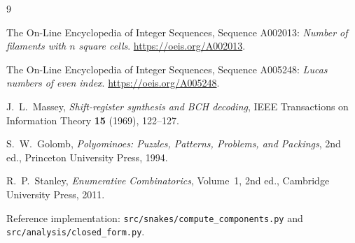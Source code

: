 \documentclass[11pt,a4paper]{article}
\theoremstyle{plain}
\theoremstyle{definition}
\theoremstyle{remark}
\numberwithin{equation}{section}
\begin{document}
\clearpage
\begin{thebibliography}{9}

The On-Line Encyclopedia of Integer Sequences, Sequence A002013:
\emph{Number of filaments with $n$ square cells}.
\url{https://oeis.org/A002013}.

The On-Line Encyclopedia of Integer Sequences, Sequence A005248:
\emph{Lucas numbers of even index}. \url{https://oeis.org/A005248}.

J.~L.~Massey, \emph{Shift-register synthesis and BCH decoding},
IEEE Transactions on Information Theory \textbf{15} (1969), 122--127.

S.~W.~Golomb, \emph{Polyominoes: Puzzles, Patterns, Problems, and
Packings}, 2nd ed., Princeton University Press, 1994.

R.~P.~Stanley, \emph{Enumerative Combinatorics}, Volume~1, 2nd ed.,
Cambridge University Press, 2011.

Reference implementation: \texttt{src/snakes/compute\_components.py} and
\texttt{src/analysis/closed\_form.py}.

\end{thebibliography}
\end{document}
